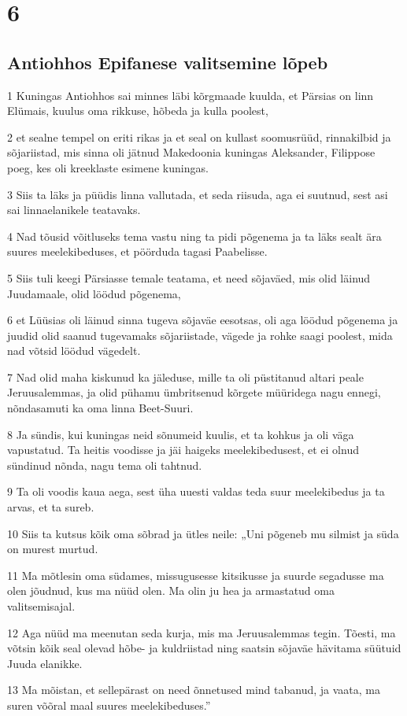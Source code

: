 \chapter{6}

\section*{Antiohhos Epifanese valitsemine lõpeb}

\par 1 Kuningas Antiohhos sai minnes läbi kõrgmaade kuulda, et Pärsias on linn Elümais, kuulus oma rikkuse, hõbeda ja kulla poolest,
\par 2 et sealne tempel on eriti rikas ja et seal on kullast soomusrüüd, rinnakilbid ja sõjariistad, mis sinna oli jätnud Makedoonia kuningas Aleksander, Filippose poeg, kes oli kreeklaste esimene kuningas.
\par 3 Siis ta läks ja püüdis linna vallutada, et seda riisuda, aga ei suutnud, sest asi sai linnaelanikele teatavaks.
\par 4 Nad tõusid võitluseks tema vastu ning ta pidi põgenema ja ta läks sealt ära suures meelekibeduses, et pöörduda tagasi Paabelisse.
\par 5 Siis tuli keegi Pärsiasse temale teatama, et need sõjaväed, mis olid läinud Juudamaale, olid löödud põgenema,
\par 6 et Lüüsias oli läinud sinna tugeva sõjaväe eesotsas, oli aga löödud põgenema ja juudid olid saanud tugevamaks sõjariistade, vägede ja rohke saagi poolest, mida nad võtsid löödud vägedelt.
\par 7 Nad olid maha kiskunud ka jäleduse, mille ta oli püstitanud altari peale Jeruusalemmas, ja olid pühamu ümbritsenud kõrgete müüridega nagu ennegi, nõndasamuti ka oma linna Beet-Suuri.
\par 8 Ja sündis, kui kuningas neid sõnumeid kuulis, et ta kohkus ja oli väga vapustatud. Ta heitis voodisse ja jäi haigeks meelekibedusest, et ei olnud sündinud nõnda, nagu tema oli tahtnud.
\par 9 Ta oli voodis kaua aega, sest üha uuesti valdas teda suur meelekibedus ja ta arvas, et ta sureb.
\par 10 Siis ta kutsus kõik oma sõbrad ja ütles neile: „Uni põgeneb mu silmist ja süda on murest murtud.
\par 11 Ma mõtlesin oma südames, missugusesse kitsikusse ja suurde segadusse ma olen jõudnud, kus ma nüüd olen. Ma olin ju hea ja armastatud oma valitsemisajal.
\par 12 Aga nüüd ma meenutan seda kurja, mis ma Jeruusalemmas tegin. Tõesti, ma võtsin kõik seal olevad hõbe- ja kuldriistad ning saatsin sõjaväe hävitama süütuid Juuda elanikke.
\par 13 Ma mõistan, et sellepärast on need õnnetused mind tabanud, ja vaata, ma suren võõral maal suures meelekibeduses.” 

